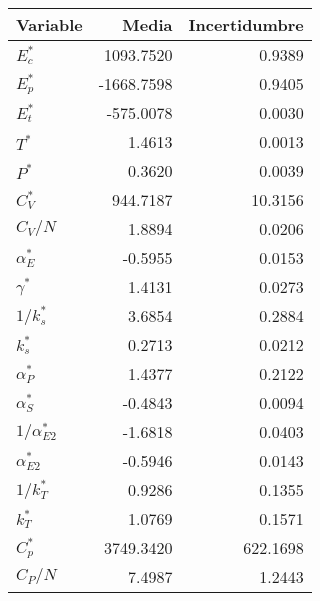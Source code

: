 \begin{tabular}{lrr}
\toprule
Variable & Media & Incertidumbre \\
\midrule
$E_c^*$ & 1093.7520 & 0.9389 \\
$E_p^*$ & -1668.7598 & 0.9405 \\
$E_t^*$ & -575.0078 & 0.0030 \\
$T^*$ & 1.4613 & 0.0013 \\
$P^*$ & 0.3620 & 0.0039 \\
$C_V^*$ & 944.7187 & 10.3156 \\
$C_V/N$ & 1.8894 & 0.0206 \\
$\alpha_E^*$ & -0.5955 & 0.0153 \\
$\gamma^*$ & 1.4131 & 0.0273 \\
$1/k_s^*$ & 3.6854 & 0.2884 \\
$k_s^*$ & 0.2713 & 0.0212 \\
$\alpha_P^*$ & 1.4377 & 0.2122 \\
$\alpha_S^*$ & -0.4843 & 0.0094 \\
$1/\alpha_{E2}^*$ & -1.6818 & 0.0403 \\
$\alpha_{E2}^*$ & -0.5946 & 0.0143 \\
$1/k_T^*$ & 0.9286 & 0.1355 \\
$k_T^*$ & 1.0769 & 0.1571 \\
$C_p^*$ & 3749.3420 & 622.1698 \\
$C_P/N$ & 7.4987 & 1.2443 \\
\bottomrule
\end{tabular}
